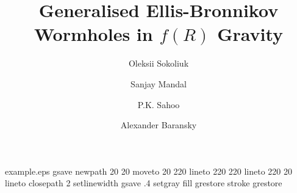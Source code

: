 %
%
%
%
%
\begin{filecontents*}{example.eps}
gsave
newpath
  20 20 moveto
  20 220 lineto
  220 220 lineto
  220 20 lineto
closepath
2 setlinewidth
gsave
  .4 setgray fill
grestore
stroke
grestore
\end{filecontents*}
%
\RequirePackage{fix-cm}
\documentclass[twocolumn,epjc3]{svjour3}  
%
\smartqed  %
%
\RequirePackage{graphicx}
\RequirePackage{float}
\RequirePackage{hyperref}
\RequirePackage{amsmath}
\usepackage{mwe}
\usepackage{widetext}
\RequirePackage{amssymb}
\RequirePackage{mathtools}   
\usepackage{orcidlink}
\usepackage{booktabs}
\usepackage{caption}
\usepackage{multirow}
\usepackage{dcolumn}
\usepackage[caption=false]{subfig}
\usepackage{float}   %
%
%
%
%


\title{Generalised Ellis-Bronnikov Wormholes in $f(R)$ Gravity}


\author{Oleksii Sokoliuk
        \and
        Sanjay Mandal
        \and
        P.K. Sahoo
        \and Alexander Baransky}
        

